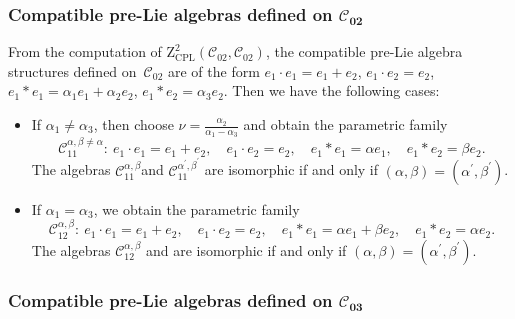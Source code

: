 \documentclass[pdftex]{sigma}
\numberwithin{equation}{section}
\begin{document}
\subsubsection[Compatible pre-Lie algebras defined on C\_\{02\}]{Compatible pre-Lie algebras defined on $\boldsymbol{\mathcal{C}_{02}}$}

From the computation of $\mathrm{Z}_{\mathrm{CPL}}^{2}(\mathcal{C}_{02},%
\mathcal{C}_{02})$, the compatible pre-Lie algebra structures defined on~$%
\mathcal{C}_{02}$ are of the form
$
e_{1}\cdot e_{1}=e_{1}+e_{2}$, $ e_{1}\cdot e_{2}=e_{2}$, $
e_{1}\ast e_{1}=\alpha _{1}e_{1}+\alpha _{2}e_{2}$, $ e_{1}\ast
e_{2}=\alpha _{3}e_{2}$.
Then we have the following cases:
\begin{itemize}\itemsep=0pt
\item If $\alpha _{1}\neq\alpha _{3}$, then choose $\nu =\frac{\alpha _{2}%
}{\alpha _{1}-\alpha _{3}}$ and obtain the parametric family
\[
\mathcal{C}_{11}^{\alpha ,\beta\neq \alpha }\colon \
e_{1}\cdot e_{1}=e_{1}+e_{2},\quad e_{1}\cdot e_{2}=e_{2},\quad
e_{1}\ast e_{1}=\alpha e_{1},\quad e_{1}\ast e_{2}=\beta e_{2}.
\]
The algebras $\mathcal{C}_{11}^{\alpha ,\beta }$and $\mathcal{C}_{11}^{\alpha
^{\prime },\beta ^{\prime }}$ are isomorphic if and only if $(\alpha,\beta)= (\alpha^{\prime },\beta ^{\prime })$.

\item If $\alpha _{1}=\alpha _{3}$, we obtain the parametric family
\[
\mathcal{C}_{12}^{\alpha ,\beta } \colon \
e_{1}\cdot e_{1}=e_{1}+e_{2},\quad e_{1}\cdot e_{2}=e_{2}, \quad
e_{1}\ast e_{1}=\alpha e_{1}+\beta e_{2},\quad e_{1}\ast e_{2}=\alpha e_{2}.
\]
The algebras $\mathcal{C}_{12}^{\alpha ,\beta }$ and  are isomorphic if and only if $(\alpha,\beta)= (\alpha^{\prime },\beta ^{\prime })$.
\end{itemize}

\subsubsection[Compatible pre-Lie algebras defined on C\_\{03\}]{Compatible pre-Lie algebras defined on $\boldsymbol{\mathcal{C}_{03}}$}
\end{document}
